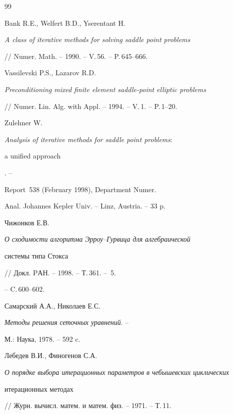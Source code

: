 \begin{thebibliography}{99}


Bank R.E., Welfert B.D., Yserentant H. 


{\em A class of iterative methods for solving saddle point problems}


// Numer. Math. -- 1990. -- V.\,56. -- P.\,645--666.







Vassilevski P.S., Lazarov R.D. 


{\em Preconditioning mixed finite element saddle-point elliptic problems}


// Numer. Lin. Alg. with Appl. -- 1994. -- V.\,1. -- P.\,1--20.







Zulehner W. 


{\em Analysis of iterative methods for saddle point problems\/${:}$


a unified approach}. --


Report \No\,538 (February 1998), Department Numer.


Anal. Johannes Kepler Univ. -- Linz, Austria. -- 33 p.







Чижонков Е.В.


{\em О сходимости алгоритма Эрроу--Гурвица для алгебраической


системы типа Стокса} // Докл. PАН. -- 1998. -- Т.\,361. -- \No\,5.


-- C.\,600--602.







Самарский А.А., Николаев Е.С.


{\em Методы решения сеточных уравнений}. --


М.: Наука, 1978. -- 592 c.







Лебедев В.И., Финогенов С.А.


{\em О порядке выбора итерационных параметров в чебышевских циклических 


итерационных методах}


// Журн. вычисл. матем. и матем. физ. -- 1971. -- Т.\,11.



\end{thebibliography}
